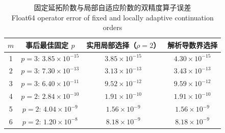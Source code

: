 \begin{table}[H]
\centering
\caption{固定延拓阶数与局部自适应阶数的双精度算子误差\\Float64 operator error of fixed and locally adaptive continuation orders}
\label{tab:adaptive-p}
\small
\begin{tabular}{cccc}
\toprule
$m$ & 事后最佳固定 $p$ & 实用局部选择（$\rho=2$） & 解析导数界选择\\
\midrule
1 & $p=3$: $3.85\times10^{-15}$ & $3.85\times10^{-15}$ & $4.30\times10^{-15}$\\
2 & $p=3$: $7.30\times10^{-13}$ & $3.13\times10^{-13}$ & $3.43\times10^{-13}$\\
3 & $p=3$: $6.40\times10^{-11}$ & $9.52\times10^{-12}$ & $9.59\times10^{-12}$\\
4 & $p=2$: $2.84\times10^{-10}$ & $1.91\times10^{-10}$ & $1.91\times10^{-10}$\\
5 & $p=2$: $4.04\times10^{-9}$ & $1.56\times10^{-9}$ & $1.56\times10^{-9}$\\
6 & $p=2$: $1.20\times10^{-8}$ & $8.18\times10^{-9}$ & $8.18\times10^{-9}$\\
\bottomrule
\end{tabular}
\end{table}
